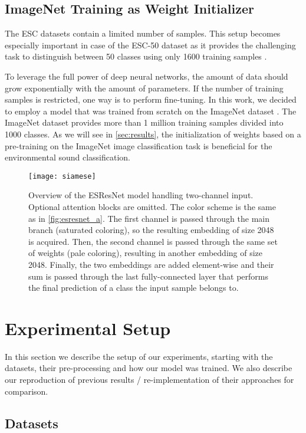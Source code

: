 \documentclass[a4paper,conference]{IEEEtran}
\begin{document}
\subsection{ImageNet Training as Weight Initializer} \label{ssec:imagenet}
The ESC datasets contain a limited number of samples.
This setup becomes especially important in case of the \mbox{ESC-50} dataset as it provides the challenging task to distinguish between 50 classes using only 1600 training samples \cite{piczak2015esc}.

To leverage the full power of deep neural networks, the amount of data should grow exponentially with the amount of parameters.
If the number of training samples is restricted, one way is to perform fine-tuning.
In this work, we decided to employ a model that was trained from scratch on the ImageNet dataset \cite{deng2009imagenet}.
The ImageNet dataset provides more than 1 million training samples divided into 1000 classes.
As we will see in \autoref{sec:results}, the initialization of weights based on a pre-training on the ImageNet image classification task is beneficial for the environmental sound classification.

\begin{figure}[hbt]
\centering
\texttt{[image: siamese]}
\caption{Overview of the ESResNet model handling two-channel input.
Optional attention blocks are omitted.
The color scheme is the same as in \autoref{fig:esresnet_a}.
The first channel is passed through the main branch (saturated coloring), so the resulting embedding of size 2048 is acquired.
Then, the second channel is passed through the same set of weights (pale coloring), resulting in another embedding of size 2048.
Finally, the two embeddings are added element-wise and their sum is passed through the last fully-connected layer that performs the final prediction of a class the input sample belongs to.}
\label{fig:siamese}
\end{figure}

\section{Experimental Setup} \label{sec:exp}
In this section we describe the setup of our experiments, starting with the datasets, their pre-processing and how our model was trained.
We also describe our reproduction of previous results / re-implementation of their approaches for comparison.

\subsection{Datasets} \label{ssec:datasets}
\end{document}
